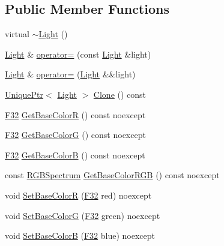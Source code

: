\subsection*{Public Member Functions}
\begin{DoxyCompactItemize}
\item 
virtual \hyperlink{classmage_1_1_light_af877bc473dede83689a4bda8a36d4d36}{$\sim$\+Light} ()
\item 
\hyperlink{classmage_1_1_light}{Light} \& \hyperlink{classmage_1_1_light_ad1267c8d162e2cdead5e3a7d83cef3c1}{operator=} (const \hyperlink{classmage_1_1_light}{Light} \&light)
\item 
\hyperlink{classmage_1_1_light}{Light} \& \hyperlink{classmage_1_1_light_a5fd2edc3fcbcc1dbe7a2620b76cedd25}{operator=} (\hyperlink{classmage_1_1_light}{Light} \&\&light)
\item 
\hyperlink{namespacemage_a3316d7143a973e37adf1110f2e80ca31}{Unique\+Ptr}$<$ \hyperlink{classmage_1_1_light}{Light} $>$ \hyperlink{classmage_1_1_light_a4c87e4a361b20519c49b4a0397625a6a}{Clone} () const
\item 
\hyperlink{namespacemage_aa97e833b45f06d60a0a9c4fc22ae02c0}{F32} \hyperlink{classmage_1_1_light_a8a1db27a646cdae15f42756ab7cea68d}{Get\+Base\+ColorR} () const noexcept
\item 
\hyperlink{namespacemage_aa97e833b45f06d60a0a9c4fc22ae02c0}{F32} \hyperlink{classmage_1_1_light_a85e946ea46ac1ba19e980a76374ff8a2}{Get\+Base\+ColorG} () const noexcept
\item 
\hyperlink{namespacemage_aa97e833b45f06d60a0a9c4fc22ae02c0}{F32} \hyperlink{classmage_1_1_light_ad81ae07280a6ef9d32c18bb473d25a04}{Get\+Base\+ColorB} () const noexcept
\item 
const \hyperlink{structmage_1_1_r_g_b_spectrum}{R\+G\+B\+Spectrum} \hyperlink{classmage_1_1_light_a37f81e786a9831ed9da0e64bd0261465}{Get\+Base\+Color\+R\+GB} () const noexcept
\item 
void \hyperlink{classmage_1_1_light_a81ad30e15e54cb1e0c53cb860b9e29d1}{Set\+Base\+ColorR} (\hyperlink{namespacemage_aa97e833b45f06d60a0a9c4fc22ae02c0}{F32} red) noexcept
\item 
void \hyperlink{classmage_1_1_light_aea8e8f31ff6b193c0af2a0cdd0f215d8}{Set\+Base\+ColorG} (\hyperlink{namespacemage_aa97e833b45f06d60a0a9c4fc22ae02c0}{F32} green) noexcept
\item 
void \hyperlink{classmage_1_1_light_a607091a28e43276ffb9d099f7519a955}{Set\+Base\+ColorB} (\hyperlink{namespacemage_aa97e833b45f06d60a0a9c4fc22ae02c0}{F32} blue) noexcept

\end{DoxyCompactItemize}
